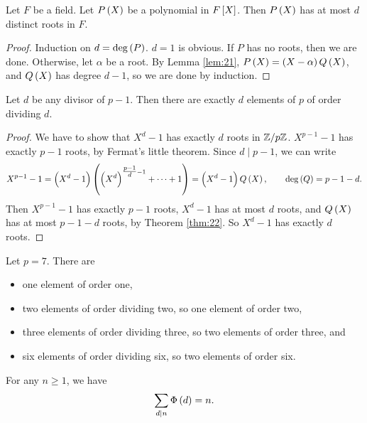 \begin{theorem}
\label{thm:22}
Let $ F $ be a field. Let $ P\br{X} $ be a polynomial in $ F\sbr{X} $. Then $ P\br{X} $ has at most $ d $ distinct roots in $ F $.
\end{theorem}

\begin{proof}
Induction on $ d = \deg\br{P} $. $ d = 1 $ is obvious. If $ P $ has no roots, then we are done. Otherwise, let $ \alpha $ be a root. By Lemma \ref{lem:21}, $ P\br{X} = \br{X - \alpha}Q\br{X} $, and $ Q\br{X} $ has degree $ d - 1 $, so we are done by induction.
\end{proof}

\begin{corollary}
\label{cor:23}
Let $ d $ be any divisor of $ p - 1 $. Then there are exactly $ d $ elements of $ \unit{p} $ of order dividing $ d $.
\end{corollary}

\begin{proof}
We have to show that $ X^d - 1 $ has exactly $ d $ roots in $ \mathbb{Z} / p\mathbb{Z} $. $ X^{p - 1} - 1 $ has exactly $ p - 1 $ roots, by Fermat's little theorem. Since $ d \mid p - 1 $, we can write
$$ X^{p - 1} - 1 = \br{X^d - 1}\br{\br{X^d}^{\tfrac{p - 1}{d} - 1} + \dots + 1} = \br{X^d - 1}Q\br{X}, \qquad \deg\br{Q} = p - 1 - d. $$
Then $ X^{p - 1} - 1 $ has exactly $ p - 1 $ roots, $ X^d - 1 $ has at most $ d $ roots, and $ Q\br{X} $ has at most $ p - 1 - d $ roots, by Theorem \ref{thm:22}. So $ X^d - 1 $ has exactly $ d $ roots.
\end{proof}

\pagebreak

\begin{example*}
Let $ p = 7 $. There are
\begin{itemize}
\item one element of order one,
\item two elements of order dividing two, so one element of order two,
\item three elements of order dividing three, so two elements of order three, and
\item six elements of order dividing six, so two elements of order six.
\end{itemize}
\end{example*}

\begin{lemma}
\label{lem:24}
For any $ n \ge 1 $, we have
$$ \sum_{d \mid n} \Phi\br{d} = n. $$
\end{lemma}

